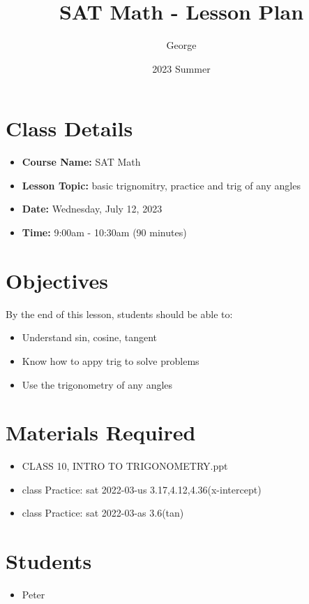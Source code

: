 \documentclass[12pt]{article}
\title{SAT Math - Lesson Plan}
\author{George}
\date{2023 Summer}
\begin{document}
\maketitle

\section{Class Details}
\begin{itemize}
    \item \textbf{Course Name:} SAT Math
    \item \textbf{Lesson Topic:}  basic trignomitry, practice and trig of any angles
    \item \textbf{Date:} Wednesday, July 12, 2023
    \item \textbf{Time:} 9:00am - 10:30am (90 minutes)
\end{itemize}

\section{Objectives}
By the end of this lesson, students should be able to:
\begin{itemize}
    \item Understand sin, cosine, tangent
    \item Know how to appy trig to solve problems
    \item Use the trigonometry of any angles
\end{itemize}

\section{Materials Required}
\begin{itemize}
   
    \item CLASS 10, INTRO TO TRIGONOMETRY.ppt
    \item class Practice: sat 2022-03-us 3.17,4.12,4.36(x-intercept)
    \item class Practice: sat 2022-03-as 3.6(tan)
  
\end{itemize}


\section{Students}
\begin{itemize}
    \item Peter

\end{itemize}
\end{document}
